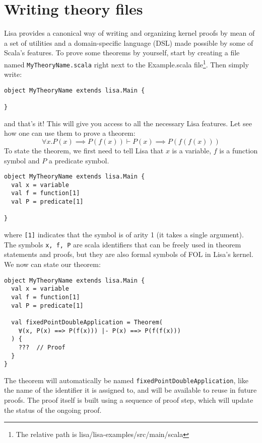 \section{Writing theory files}
Lisa provides a canonical way of writing and organizing kernel proofs by mean of a set of utilities and a domain-specific language (DSL) made possible by some of Scala's features.
To prove some theorems by yourself, start by creating a file named \lstinline|MyTheoryName.scala| right next to the Example.scala file\footnote{The relative path is lisa/lisa-examples/src/main/scala}.
Then simply write:

\noindent\begin{minipage}{\linewidth}\vspace{1em}
\begin{lstlisting}[language=lisa, frame=single]
object MyTheoryName extends lisa.Main {

}
\end{lstlisting}
\end{minipage}
and that's it! This will give you access to all the necessary Lisa features. Let see how one can use them to prove a theorem:
$$
  \forall x. P(x) \implies P(f(x)) \vdash P(x) \implies P(f(f(x)))
$$
To state the theorem, we first need to tell Lisa that $x$ is a variable, $f$ is a function symbol and $P$ a predicate symbol. 

\noindent\begin{minipage}{\linewidth}\vspace{1em}
\begin{lstlisting}[language=lisa, frame=single]
object MyTheoryName extends lisa.Main {
  val x = variable
  val f = function[1]
  val P = predicate[1]

}
\end{lstlisting}
\end{minipage}

where \lstinline|[1]| indicates that the symbol is of arity 1 (it takes a single argument). The symbols \lstinline|x, f, P| are scala identifiers that can be freely used in theorem statements and proofs, but they are also formal symbols of FOL in Lisa's kernel. 
We now can state our theorem:

\noindent\begin{minipage}{\linewidth}\vspace{1em}
\begin{lstlisting}[language=lisa, frame=single]
object MyTheoryName extends lisa.Main {
  val x = variable
  val f = function[1]
  val P = predicate[1]

  val fixedPointDoubleApplication = Theorem(
    ∀(x, P(x) ==> P(f(x))) |- P(x) ==> P(f(f(x)))
  ) {
    ???  // Proof
  } 
}
\end{lstlisting}
\end{minipage}
The theorem will automatically be named \lstinline|fixedPointDoubleApplication|, like the name of the identifier it is assigned to, and will be available to reuse in future proofs. The proof itself is built using a sequence of proof step, which will update the status of the ongoing proof.

